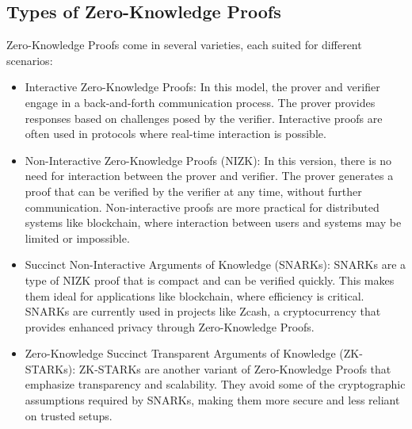 \subsection{Types of Zero-Knowledge Proofs}
Zero-Knowledge Proofs come in several varieties, each suited for different scenarios:
\begin{itemize}
    \item Interactive Zero-Knowledge Proofs: In this model, the prover and verifier engage in a back-and-forth communication process. The prover provides responses based on challenges posed by the verifier. Interactive proofs are often used in protocols where real-time interaction is possible.
    \item Non-Interactive Zero-Knowledge Proofs (NIZK): In this version, there is no need for interaction between the prover and verifier. The prover generates a proof that can be verified by the verifier at any time, without further communication. Non-interactive proofs are more practical for distributed systems like blockchain, where interaction between users and systems may be limited or impossible.
    \item Succinct Non-Interactive Arguments of Knowledge (SNARKs): SNARKs are  a type of NIZK proof that is compact and can be verified quickly. This makes them ideal for applications like blockchain, where efficiency is critical. SNARKs are currently used in projects like Zcash, a cryptocurrency that provides enhanced privacy through Zero-Knowledge Proofs.
    \item Zero-Knowledge Succinct Transparent Arguments of Knowledge (ZK-STARKs): ZK-STARKs are another variant of Zero-Knowledge Proofs that emphasize transparency and scalability. They avoid some of the cryptographic assumptions required by SNARKs, making them more secure and less reliant on trusted setups.
\end{itemize}